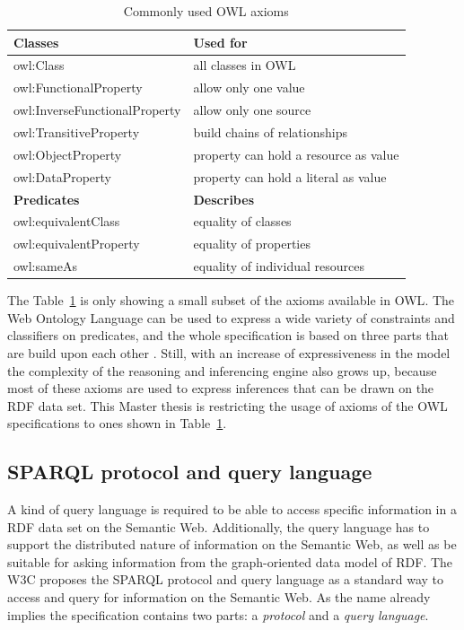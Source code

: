 \begin{table}[H]
\centering
\begin{tabular}{p{5cm}p{7cm}}
\hline
\textbf{Classes} & \textbf{Used for} \\
\hline
owl:Class & all classes in \gls{OWL}  \\
\hline
owl:FunctionalProperty & allow only one value \\
\hline
owl:InverseFunctionalProperty & allow only one source \\
\hline
owl:TransitiveProperty & build chains of relationships \\
\hline
owl:ObjectProperty & property can hold a resource as value \\
\hline
owl:DataProperty & property can hold a literal as value \\
\hline
\textbf{Predicates} & \textbf{Describes} \\
\hline
owl:equivalentClass &	equality of classes \\
\hline
owl:equivalentProperty & equality of properties \\
\hline
owl:sameAs & equality of individual resources \\
\hline
\end{tabular}
\caption[Commonly used \gls{OWL} axioms]{Commonly used \gls{OWL} axioms \citep[pg. 153-185]{allemang2011semantic}}
\label{tab:w3c_vocab_owl}
\end{table}

The Table~\ref{tab:w3c_vocab_owl} is only showing a small subset of the axioms available in \gls{OWL}. The Web Ontology Language can be used to express a wide variety of constraints and classifiers on predicates, and the whole specification is based on three parts that are build upon each other \citep{owlspec}. Still, with an increase of expressiveness in the model the complexity of the reasoning and inferencing engine also grows up, because most of these axioms are used to express inferences that can be drawn on the \gls{RDF} data set. This Master thesis is restricting the usage of axioms of the \gls{OWL} specifications to ones shown in Table~\ref{tab:w3c_vocab_owl}.


\subsection{\gls{SPARQL} protocol and query language}
\label{sec:semantic_querylang}

A kind of query language is required to be able to access specific information in a \gls{RDF} data set on the Semantic Web. Additionally, the query language has to support the distributed nature of information on the Semantic Web, as well as be suitable for asking information from the graph-oriented data model of \gls{RDF}. The \gls{W3C} proposes the \gls{SPARQL} protocol and query language as a standard way to access and query for information on the Semantic Web. As the name already implies the specification contains two parts: a \emph{protocol} and a \emph{query language}. \\

